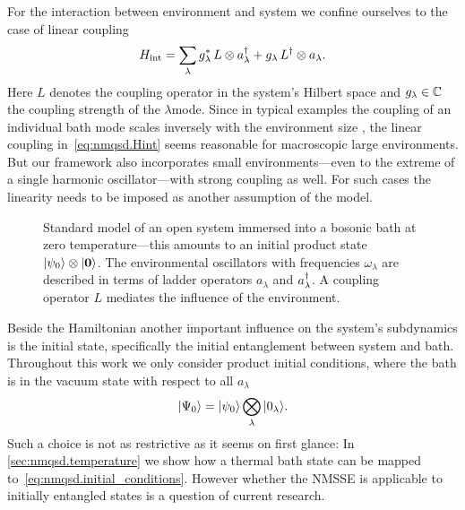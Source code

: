 For the interaction between environment and system we confine ourselves to the case of linear coupling
\begin{equation}
  H_\mathrm{int} = \sum_\lambda {g}^*_\lambda \, L \otimes a^\dagger_\lambda + g_\lambda \, L^\dagger \otimes a_\lambda.
  \label{eq:nmqsd.Hint}
\end{equation}
Here $L$ denotes the coupling operator in the system's Hilbert space and $g_\lambda \in \mathbb{C}$ the coupling strength of the $\lambda$\th mode.
Since in typical examples the coupling of an individual bath mode scales inversely with the environment size \cite{We99_dissipative_systems}, the linear coupling in~\ref{eq:nmqsd.Hint} seems reasonable for macroscopic large environments.
But our framework also incorporates small environments---even to the extreme of a single harmonic oscillator---with strong coupling as well.
For such cases the linearity needs to be imposed as another assumption of the model.

\begin{figure}
  \centering
  
  \caption{%
    Standard model of an open system immersed into a bosonic bath at zero temperature---this amounts to an initial product state $| \psi_0 \rangle\otimes| \boldsymbol{0} \rangle$.
    The environmental oscillators with frequencies $\omega_\lambda$ are described in terms of ladder operators $a_\lambda$ and $a^\dagger_\lambda$.
    A coupling operator $L$ mediates the influence of the environment.
  }
  \label{fig:nmqsd.open_system}
\end{figure}

Beside the Hamiltonian another important influence on the system's subdynamics is the initial state, specifically the initial entanglement between system and bath.
Throughout this work we only consider product initial conditions, where the bath is in the vacuum state with respect to all $a_\lambda$
\begin{equation}
  | \Psi_0 \rangle = | \psi_0 \rangle \bigotimes\limits_\lambda | 0_\lambda \rangle.
  \label{eq:nmqsd.initial_conditions}
\end{equation}
Such a choice is not as restrictive as it seems on first glance: In \autoref{sec:nmqsd.temperature} we show how a thermal bath state can be mapped to~\ref{eq:nmqsd.initial_conditions}.
However whether the NMSSE is applicable to initially entangled states is a question of current research.\\



